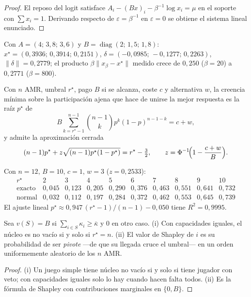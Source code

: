 \begin{proof}
El reposo del logit satisface $A_i-(Bx)_i-\beta^{-1}\log x_i=\mu$ en el soporte
con $\sum x_i=1$. Derivando respecto de $\varepsilon=\beta^{-1}$ en
$\varepsilon=0$ se obtiene el sistema lineal enunciado.
\end{proof}

Con $A=(4;\,3{,}8;\,3{,}6)$ y $B=\operatorname{diag}(2;\,1{,}5;\,1{,}8)$:
$x^\star=(0{,}3936;\,0{,}3914;\,0{,}2151)$, $\delta=(-0{,}0985;\,-0{,}1277;\,0{,}2263)$,
$\lVert\delta\rVert=0{,}2779$; el producto $\beta\lVert x_\beta-x^\star\rVert$
medido crece de $0{,}250$ ($\beta=20$) a $0{,}2771$ ($\beta=800$).

\begin{teorema}
\label{th:N-ciervo}
Con $n$ AMR, umbral $r^\star$, pago $B$ si se alcanza, coste $c$ y alternativa
$w$, la creencia mínima sobre la participación ajena que hace de unirse la mejor
respuesta es la raíz $p^\star$ de
\[
  B\sum_{k=r^\star-1}^{n-1}\binom{n-1}{k}p^{k}(1-p)^{n-1-k}=c+w,
\]
y admite la aproximación cerrada
\[
  (n-1)p^\star+z\sqrt{(n-1)p^\star(1-p^\star)}=r^\star-\tfrac32,
  \qquad z=\Phi^{-1}\!\Bigl(1-\frac{c+w}{B}\Bigr).
\]
\end{teorema}

Con $n=12$, $B=10$, $c=1$, $w=3$ ($z=0{,}2533$):
\[
\begin{array}{c|ccccccccc}
 r^\star & 2&3&4&5&6&7&8&9&10\\\hline
 \text{exacto} & 0{,}045&0{,}123&0{,}205&0{,}290&0{,}376&0{,}463&0{,}551&0{,}641&0{,}732\\
 \text{normal} & 0{,}032&0{,}112&0{,}197&0{,}284&0{,}372&0{,}462&0{,}553&0{,}645&0{,}739
\end{array}
\]
El ajuste lineal $p^\star\approx0{,}947\,(r^\star-1)/(n-1)-0{,}050$ tiene
$R^2=0{,}9995$.

\begin{teorema}
\label{th:N-nucleo}
Sea $v(S)=B$ si $\sum_{i\in S}\kappa_i\ge\bar\kappa$ y $0$ en otro caso. (i) Con
capacidades iguales, el núcleo es no vacío si y solo si $r^\star=n$. (ii) El
valor de Shapley de $i$ es su probabilidad de ser \emph{pivote} —de que su
llegada cruce el umbral— en un orden uniformemente aleatorio de los $n$ AMR.
\end{teorema}

\begin{proof}
(i) Un juego simple tiene núcleo no vacío si y solo si tiene jugador con veto;
con capacidades iguales solo lo hay cuando hacen falta todos. (ii) Es la
fórmula de Shapley con contribuciones marginales en $\{0,B\}$.
\end{proof}

